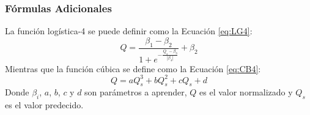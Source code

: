 \subsubsection*{Fórmulas Adicionales}
\label{ape:Formulas}
La función logística-4 se puede definir como la Ecuación \eqref{eq:LG4}:
\begin{equation}
Q = \frac{\beta_1 - \beta_2}{1 + e^{-\frac{Q_s-\beta_3}{|\beta_4|}}} + \beta_2 
\label{eq:LG4}
\end{equation}
Mientras que la función cúbica se define como la Ecuación \eqref{eq:CB4}:
\begin{equation}
Q = aQ_s^3 + bQ_s^2 + cQ_s + d
\label{eq:CB4}
\end{equation}
Donde $\beta_i$, $a$, $b$, $c$ y $d$ son parámetros a aprender, $Q$ es el valor 
normalizado y $Q_s$ es el valor predecido.
